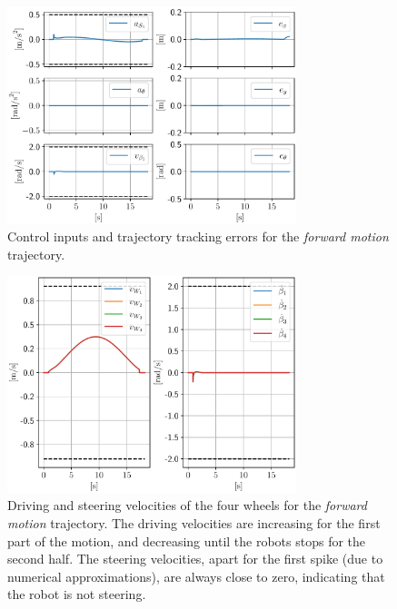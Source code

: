 \begin{figure}
    \centering
    \includegraphics[width=0.75\textwidth]{figures/SWMR/simulations/forward/inputs_and_errors.pdf}
    \caption{Control inputs and trajectory tracking errors for the
        \textit{forward motion} trajectory.
    }
    \label{fig:simulations:forward:inputs-and-errors}
\end{figure}
\begin{figure}
    \centering
    \includegraphics[width=0.75\textwidth]{figures/SWMR/simulations/forward/wheels_velocities.pdf}
    \caption{Driving and steering velocities of the four wheels for the
        \textit{forward motion} trajectory. The driving velocities are increasing
        for the first part of the motion, and decreasing until the robots stops
        for the second half. The steering velocities, apart for the first spike
        (due to numerical approximations), are always close to zero, indicating
        that the robot is not steering.}
    \label{fig:simulations:forward:wheel-velocities}
\end{figure}

